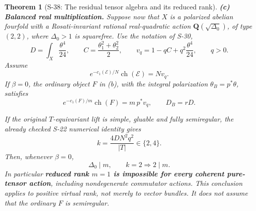 \documentclass[11pt,a4paper]{article}
\newtheorem{theorem}{Theorem}[section]
\theoremstyle{definition}
\begin{document}
\begin{theorem}[S-38: The residual tensor algebra and its reduced rank]
\textbf{(c) Balanced real multiplication.} Suppose now that \(X\) is a polarized abelian fourfold with a Rosati-invariant rational real-quadratic action \(\mathbf Q(\sqrt{\Delta_0})\), of type \((2,2)\), where \(\Delta_0>1\) is squarefree. Use the notation of S-30, \[
 D=\int_X\frac{\theta^4}{24},\qquad
 C=\frac{\theta_1^2+\theta_2^2}{2},\qquad
 v_q=1-qC+q^2\frac{\theta^4}{24},\qquad q>0.
\] Assume \[
 e^{-c_1(\mathcal E)/N}\operatorname{ch}(\mathcal E)=Nv_q.
 \tag{S38.8}
\] If \(\beta=0\), the ordinary object \(F\) in (b), with the integral polarization \(\theta_B=p^*\theta\), satisfies \[
 e^{-c_1(F)/m}\operatorname{ch}(F)=m\,p^*v_q,
 \qquad D_B=rD.
 \tag{S38.9}
\]

If the original \(T\)-equivariant lift is simple, gluable and fully semiregular, the already checked S-22 numerical identity gives \[
 k=\frac{4DN^2q^2}{|T|}\in\{2,4\}.
 \tag{S38.10}
\] Then, whenever \(\beta=0\), \[
 \boxed{\Delta_0\mid m,\qquad k=2\Longrightarrow 2\mid m.}
 \tag{S38.11}
\] In particular \textbf{reduced rank \(m=1\) is impossible for every coherent pure-tensor action}, including nondegenerate commutator actions. This conclusion applies to positive virtual rank, not merely to vector bundles. It does not assume that the ordinary \(F\) is semiregular.
\end{theorem}
\end{document}
